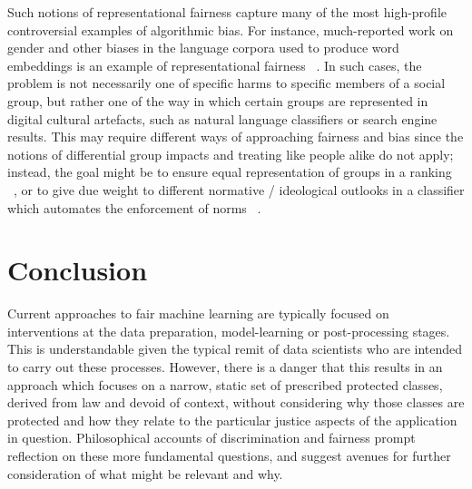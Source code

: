 \documentclass[pmlr,twocolumn,10pt]{jmlr}%
\begin{document}
Such notions of representational fairness capture many of the most high-profile controversial examples of algorithmic bias. For instance, much-reported work on gender and other biases in the language corpora used to produce word embeddings is an example of representational fairness ~\cite{bolukbasi2016man,caliskan2016semantics}. In such cases, the problem is not necessarily one of specific harms to specific members of a social group, but rather one of the way in which certain groups are represented in digital cultural artefacts, such as natural language classifiers or search engine results. This may require different ways of approaching fairness and bias since the notions of differential group impacts and treating like people alike do not apply; instead, the goal might be to ensure equal representation of groups in a ranking ~\cite{zehlike2017fa}, or to give due weight to different normative / ideological outlooks in a classifier which automates the enforcement of norms ~\cite{binns2017like}.

\section{Conclusion}

Current approaches to fair machine learning are typically focused on interventions at the data preparation, model-learning or post-processing stages. This is understandable given the typical remit of data scientists who are intended to carry out these processes. However, there is a danger that this results in an approach which focuses on a narrow, static set of prescribed protected classes, derived from law and devoid of context, without considering why those classes are protected and how they relate to the particular justice aspects of the application in question. Philosophical accounts of discrimination and fairness prompt reflection on these more fundamental questions, and suggest avenues for further consideration of what might be relevant and why. 
\end{document}
